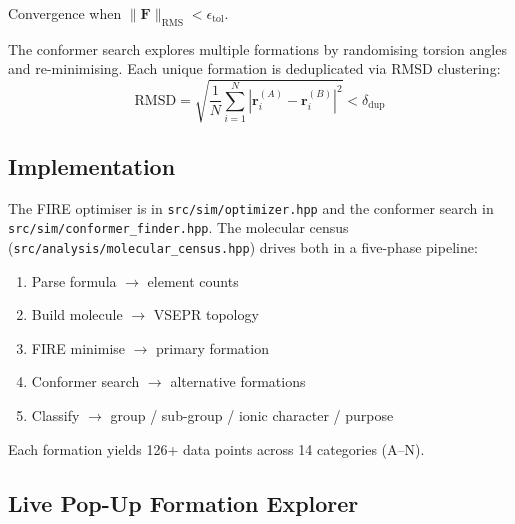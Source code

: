 \documentclass[11pt,a4paper]{article}
\begin{document}
Convergence when $\|\bm{F}\|_{\text{RMS}} < \epsilon_{\text{tol}}$.

The conformer search explores multiple formations by randomising torsion
angles and re-minimising.  Each unique formation is deduplicated via
RMSD clustering:
\begin{equation}
  \text{RMSD} = \sqrt{\frac{1}{N}\sum_{i=1}^{N}|\bm{r}_{i}^{(A)} - \bm{r}_{i}^{(B)}|^{2}}
  < \delta_{\text{dup}}
  \label{eq:rmsd}
\end{equation}

\subsection{Implementation}

The FIRE optimiser is in \texttt{src/sim/optimizer.hpp} and the conformer
search in \texttt{src/sim/conformer\_finder.hpp}.  The molecular census
(\texttt{src/analysis/molecular\_census.hpp}) drives both in a five-phase
pipeline:

\begin{enumerate}
  \item Parse formula $\rightarrow$ element counts
  \item Build molecule $\rightarrow$ VSEPR topology
  \item FIRE minimise $\rightarrow$ primary formation
  \item Conformer search $\rightarrow$ alternative formations
  \item Classify $\rightarrow$ group / sub-group / ionic character / purpose
\end{enumerate}

Each formation yields 126+ data points across 14 categories (A--N).

\subsection{Live Pop-Up Formation Explorer}
\end{document}
